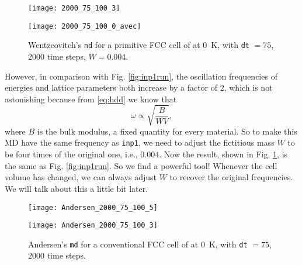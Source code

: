 \begin{figure}[h]
  \centering
  \begin{minipage}[t]{.48\linewidth}
    \centering
    \texttt{[image: 2000\_75\_100\_3]}
    \label{fig:inp4:a}
  \end{minipage}%
  \hfill
  \begin{minipage}[t]{.48\linewidth}
    \centering
    \texttt{[image: 2000\_75\_100\_0\_avec]}
    \label{fig:inp4:b}
  \end{minipage}
  \caption{
    Wentzcovitch's \texttt{nd} for a primitive FCC cell of  at \SI{0}{\kelvin}, with \texttt{dt} $=75$, $2000$ time steps, $W = 0.004$.}
  \label{fig:inp4}
\end{figure}

However, in comparison with Fig. \ref{fig:inp1run},
the oscillation frequencies of energies and lattice parameters
both increase by a factor of $2$, which is not astonishing because from
\eqref{eq:hdd} we know that
\begin{equation}
	\omega \propto \sqrt{
		\frac{ B }{ W V }
	},
\end{equation}
where $B$ is the bulk modulus, a fixed quantity for every material. So to make this MD
have the same frequency as \texttt{inp1}, we need to adjust the fictitious mass $W$ to be
four times of the original one, i.e., $0.004$. 
Now the result, shown in Fig. \ref{fig:inp4}, is the same as Fig. \ref{fig:inp1run}. So we find a powerful tool! Whenever the cell volume has changed, we can always
adjust $W$ to recover the original frequencies. We will talk about this a little bit later.

\begin{figure}[h]
	\centering
	\begin{minipage}[t]{0.48\textwidth}
		\centering
		\texttt{[image: Andersen\_2000\_75\_100\_5]}
		\label{fig:andersen0:mini:subfig:a}   %
	\end{minipage}
	\hfill
	\begin{minipage}[t]{0.48\textwidth}
		\centering
		\texttt{[image: Andersen\_2000\_75\_100\_3]}
		\label{fig:andersen0:mini:subfig:b}   %
	\end{minipage}
	\caption{Andersen's \texttt{md} for a conventional FCC cell of  at \SI{0}{\kelvin}, with
  \texttt{dt} $=75$, $2000$ time steps.}
	\label{fig:andersen0}   %
\end{figure}

